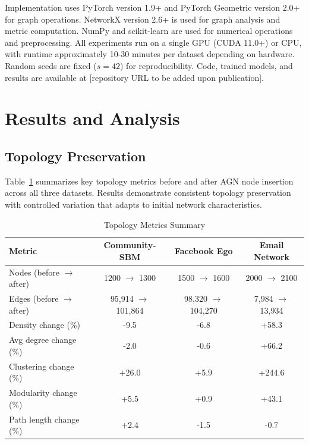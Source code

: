 \documentclass[12pt]{article}
\begin{document}
Implementation uses PyTorch \cite{paszke2019pytorch} version 1.9+ and PyTorch Geometric \cite{fey2019fast} version 2.0+ for graph operations. NetworkX \cite{hagberg2008exploring} version 2.6+ is used for graph analysis and metric computation. NumPy \cite{harris2020array} and scikit-learn \cite{pedregosa2011scikit} are used for numerical operations and preprocessing. All experiments run on a single GPU (CUDA 11.0+) or CPU, with runtime approximately 10-30 minutes per dataset depending on hardware. Random seeds are fixed ($s=42$) for reproducibility. Code, trained models, and results are available at [repository URL to be added upon publication].

\section{Results and Analysis}

\subsection{Topology Preservation}

Table~\ref{tab:topology_summary} summarizes key topology metrics before and after AGN node insertion across all three datasets. Results demonstrate consistent topology preservation with controlled variation that adapts to initial network characteristics.

\begin{table}[h]
\centering
\caption{Topology Metrics Summary}
\label{tab:topology_summary}
\begin{tabular}{lccc}
\toprule
Metric & Community-SBM & Facebook Ego & Email Network \\
\midrule
Nodes (before $\rightarrow$ after) & 1200 $\rightarrow$ 1300 & 1500 $\rightarrow$ 1600 & 2000 $\rightarrow$ 2100 \\
Edges (before $\rightarrow$ after) & 95,914 $\rightarrow$ 101,864 & 98,320 $\rightarrow$ 104,270 & 7,984 $\rightarrow$ 13,934 \\
Density change (\%) & -9.5 & -6.8 & +58.3 \\
Avg degree change (\%) & -2.0 & -0.6 & +66.2 \\
Clustering change (\%) & +26.0 & +5.9 & +244.6 \\
Modularity change (\%) & +5.5 & +0.9 & +43.1 \\
Path length change (\%) & +2.4 & -1.5 & -0.7 \\
\bottomrule
\end{tabular}
\end{table}
\end{document}
